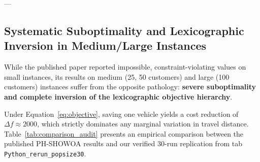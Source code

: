 ---

\subsection{Systematic Suboptimality and Lexicographic Inversion in Medium/Large Instances}
While the published paper reported impossible, constraint-violating values on small instances, its results on medium (25, 50 customers) and large (100 customers) instances suffer from the opposite pathology: \textbf{severe suboptimality and complete inversion of the lexicographic objective hierarchy}.

Under Equation~\eqref{eq:objective}, saving one vehicle yields a cost reduction of $\Delta f \approx 2000$, which strictly dominates any marginal variation in travel distance. Table~\ref{tab:comparison_audit} presents an empirical comparison between the published PH-SHOWOA results and our verified 30-run replication from tab \texttt{Python\_rerun\_popsize30}.

